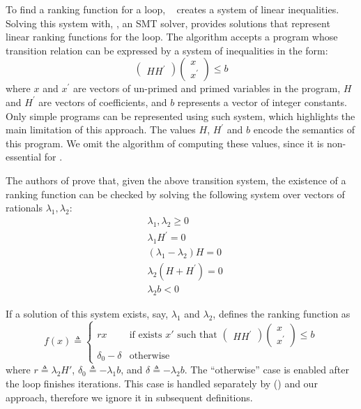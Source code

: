 To find a ranking function for a loop, \rfs~\cite{podelski2004lrf} creates a system of linear inequalities. Solving this system with, \eg, an SMT solver, provides solutions that represent linear ranking functions for the loop. The algorithm accepts a program whose transition relation can be expressed by a system of inequalities in the form:
\begin{equation}\label{eq:rfs_transition}
\begin{pmatrix}
HH^\prime
\end{pmatrix}
\begin{pmatrix}
x\\x^\prime
\end{pmatrix} \le  b
\end{equation}
\noindent where $x$ and $x^\prime$ are vectors of un-primed and primed variables in the program, $H$ and $H^\prime$ are vectors of coefficients, and $b$ represents a vector of integer constants. Only simple programs can be represented using such system, which highlights the main limitation of this approach. The values $H$, $H^\prime$ and $b$ encode the semantics of this program. We omit the algorithm of computing these values, since it is non-essential for \projName.

The authors of \rfs prove that, given the above transition system, the existence of a ranking function can be checked by solving the following system over vectors of rationals $\lambda_1, \lambda_2$:
\begin{align*}
&\lambda_1, \lambda_2 \ge 0\\
&\lambda_1 H^\prime = 0\\
&(\lambda_1 - \lambda_2)H = 0\\
&\lambda_2 (H+H^\prime) = 0\\
&\lambda_2 b < 0
\end{align*}

If a solution of this system exists, say, $\lambda_1$ and $\lambda_2$, \rfs defines the ranking function as
\begin{equation}
  f(x) \triangleq
    \begin{cases}
      rx & \text{if exists $x'$ such that $\begin{pmatrix} HH^\prime \end{pmatrix} \begin{pmatrix} x\\x^\prime \end{pmatrix} \le  b$}\\
      \delta_0 - \delta & \text{otherwise}
    \end{cases}       
\end{equation}
\noindent where $r \triangleq \lambda_2 H'$, $\delta_0 \triangleq -\lambda_1 b$, and $\delta \triangleq -\lambda_2 b$. The ``otherwise'' case is enabled after the loop finishes iterations. This case is handled separately by \dta () and our approach, therefore we ignore it in subsequent definitions.

